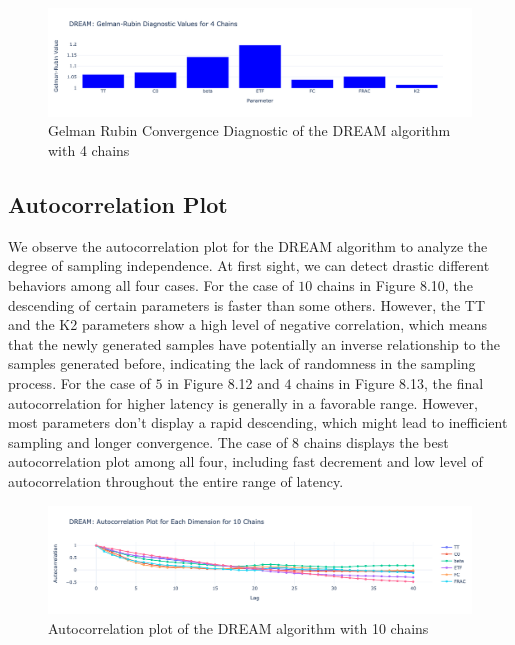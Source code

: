 \begin{figure}[H]
    \centering
    \includegraphics[width=1\textwidth]{figures/dream/gr_4.png}
    \captionsetup{width=.8\textwidth}
    \caption{Gelman Rubin Convergence Diagnostic of the DREAM algorithm with 4 chains}
    \label{fig:enter-label}
\end{figure}

\subsection{Autocorrelation Plot}
We observe the autocorrelation plot for the DREAM algorithm to analyze the degree of sampling independence. At first sight, we can detect drastic different behaviors among all four cases. For the case of $10$ chains in Figure 8.10, the descending of certain parameters is faster than some others. However, the TT and the K2 parameters show a high level of negative correlation, which means that the newly generated samples have potentially an inverse relationship to the samples generated before, indicating the lack of randomness in the sampling process. For the case of $5$ in Figure 8.12 and $4$ chains in Figure 8.13, the final autocorrelation for higher latency is generally in a favorable range. However, most parameters don't display a rapid descending, which might lead to inefficient sampling and longer convergence. The case of $8$ chains displays the best autocorrelation plot among all four, including fast decrement and low level of autocorrelation throughout the entire range of latency.
\begin{figure}[H]
    \centering
    \includegraphics[width=1\textwidth]{figures/dream/ac_10.png}
    \captionsetup{width=.8\textwidth}
    \caption{Autocorrelation plot of the DREAM algorithm with 10 chains}
    \label{fig:enter-label}
\end{figure}

